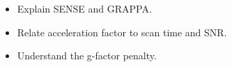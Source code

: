 \begin{objectives}
\begin{itemize}[leftmargin=1.4em,itemsep=2pt]
\item Explain SENSE and GRAPPA.
\item Relate acceleration factor to scan time and SNR.
\item Understand the g-factor penalty.
\end{itemize}
\end{objectives}
